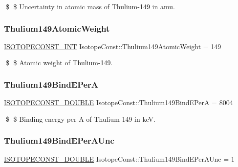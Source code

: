 \$ \$ Uncertainty in atomic mass of Thulium-\/149 in amu. \mbox{\label{group___isotope_const-_thulium-_tm149_gac28e59b6de782e7e8075d02c569904c7}} 
\subsubsection{\texorpdfstring{Thulium149\+Atomic\+Weight}{Thulium149AtomicWeight}}
{\footnotesize\ttfamily \mbox{\hyperlink{group___isotope_const-_macros_ga5f18360b3e99483a35c32d789e62621c}{I\+S\+O\+T\+O\+P\+E\+C\+O\+N\+S\+T\+\_\+\+I\+NT}} Isotope\+Const\+::\+Thulium149\+Atomic\+Weight = 149}

\$ \$ Atomic weight of Thulium-\/149. \mbox{\label{group___isotope_const-_thulium-_tm149_gaa06614a6b189eb1263469caeac39f6a5}} 
\subsubsection{\texorpdfstring{Thulium149\+Bind\+E\+PerA}{Thulium149BindEPerA}}
{\footnotesize\ttfamily \mbox{\hyperlink{group___isotope_const-_macros_ga8f45a7272ce02c0b4c65c44636ed719a}{I\+S\+O\+T\+O\+P\+E\+C\+O\+N\+S\+T\+\_\+\+D\+O\+U\+B\+LE}} Isotope\+Const\+::\+Thulium149\+Bind\+E\+PerA = 8004}

\$ \$ Binding energy per A of Thulium-\/149 in keV. \mbox{\label{group___isotope_const-_thulium-_tm149_ga6db5c0bf2bf78813745f62787f905097}} 
\subsubsection{\texorpdfstring{Thulium149\+Bind\+E\+Per\+A\+Unc}{Thulium149BindEPerAUnc}}
{\footnotesize\ttfamily \mbox{\hyperlink{group___isotope_const-_macros_ga8f45a7272ce02c0b4c65c44636ed719a}{I\+S\+O\+T\+O\+P\+E\+C\+O\+N\+S\+T\+\_\+\+D\+O\+U\+B\+LE}} Isotope\+Const\+::\+Thulium149\+Bind\+E\+Per\+A\+Unc = 1}


